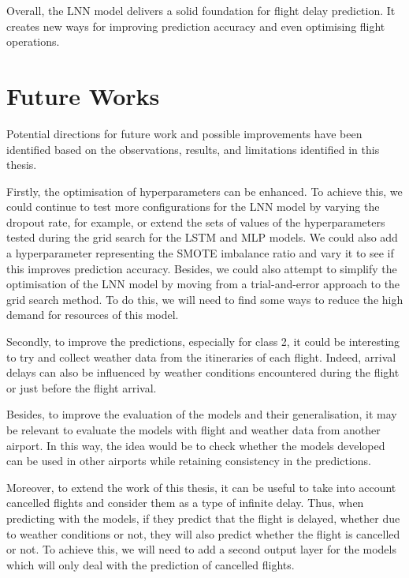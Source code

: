 \documentclass[12pt,oneside]{book} %
\begin{document}
\noindent Overall, the LNN model delivers a solid foundation for flight delay prediction. It creates new ways for improving prediction accuracy and even optimising flight operations.

\section{Future Works}

\noindent Potential directions for future work and possible improvements have been identified based on the observations, results, and limitations identified in this thesis.

\noindent Firstly, the optimisation of hyperparameters can be enhanced. To achieve this, we could continue to test more configurations for the LNN model by varying the dropout rate, for example, or extend the sets of values of the hyperparameters tested during the grid search for the LSTM and MLP models. We could also add a hyperparameter representing the SMOTE imbalance ratio and vary it to see if this improves prediction accuracy. Besides, we could also attempt to simplify the optimisation of the LNN model by moving from a trial-and-error approach to the grid search method. To do this, we will need to find some ways to reduce the high demand for resources of this model.

\noindent Secondly, to improve the predictions, especially for class 2, it could be interesting to try and collect weather data from the itineraries of each flight. Indeed, arrival delays can also be influenced by weather conditions encountered during the flight or just before the flight arrival.

\noindent Besides, to improve the evaluation of the models and their generalisation, it may be relevant to evaluate the models with flight and weather data from another airport. In this way, the idea would be to check whether the models developed can be used in other airports while retaining consistency in the predictions.

\noindent Moreover, to extend the work of this thesis, it can be useful to take into account cancelled flights and consider them as a type of infinite delay. Thus, when predicting with the models, if they predict that the flight is delayed, whether due to weather conditions or not, they will also predict whether the flight is cancelled or not. To achieve this, we will need to add a second output layer for the models which will only deal with the prediction of cancelled flights.
\end{document}
